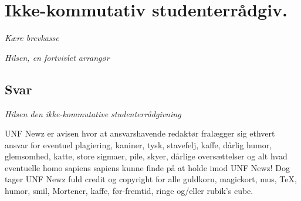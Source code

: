 \begin{minipage}[b]{0.95\linewidth}
\begin{minipage}[t]{0.47\textwidth}
\vspace{-4mm}
\section*{Ikke-kommutativ studenterrådgiv.}
\emph{Kære brevkasse}
 
\emph{Hilsen, en fortvivlet arrangør}

\vspace{-1mm}
\subsection*{Svar}

{\flushright\emph{Hilsen den ikke-kommutative studenterrådgivning}}

\vspace{1mm}
\vspace{-3mm}
\end{minipage}

\begin{center}
\tiny UNF Newz er avisen hvor at ansvarshavende redaktør fralægger sig ethvert ansvar for eventuel plagiering, kaniner, tysk, stavefelj, kaffe, dårlig humor, glemsomhed, katte, store sigmaer, pile, skyer, dårlige oversættelser og alt hvad eventuelle homo sapiens sapiens kunne finde på at holde imod UNF Newz! Dog tager UNF Newz fuld credit og copyright for alle guldkorn, magickort, mus, \TeX, humor, smil, Mortener, kaffe, før-fremtid, ringe og/eller rubik's cube.
\end{center}
\end{minipage}


